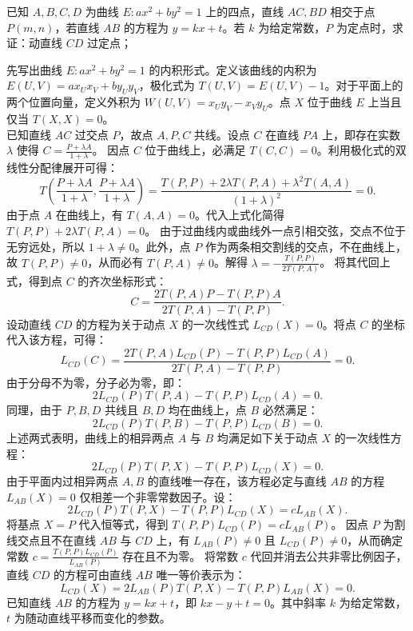 \begin{example}
已知 \(A,B,C,D\) 为曲线 \(E: ax^2 + by^2 = 1\) 上的四点，直线 \(AC,BD\) 相交于点 \(P(m,n)\)，若直线 \(AB\) 的方程为 \(y = kx + t\)。若 \(k\) 为给定常数，\(P\) 为定点时，求证：动直线 \(CD\) 过定点；
\end{example}
\begin{solution}
先写出曲线 $E: ax^2 + by^2 = 1$ 的内积形式。定义该曲线的内积为 $E(U, V) = ax_U x_V + by_U y_V$，极化式为 $T(U, V) = E(U, V) - 1$。对于平面上的两个位置向量，定义外积为 $W(U, V) = x_U y_V - x_V y_U$。点 $X$ 位于曲线 $E$ 上当且仅当 $T(X, X) = 0$。\\
已知直线 $AC$ 过交点 $P$，故点 $A, P, C$ 共线。设点 $C$ 在直线 $PA$ 上，即存在实数 $\lambda$ 使得 $C = \frac{P + \lambda A}{1+\lambda}$。
因点 $C$ 位于曲线上，必满足 $T(C, C) = 0$。利用极化式的双线性分配律展开可得：
\[ T\left(\frac{P + \lambda A}{1+\lambda}, \frac{P + \lambda A}{1+\lambda}\right) = \frac{T(P, P) + 2\lambda T(P, A) + \lambda^2 T(A, A)}{(1+\lambda)^2} = 0. \]
由于点 $A$ 在曲线上，有 $T(A, A) = 0$。代入上式化简得 $T(P, P) + 2\lambda T(P, A) = 0$。
由于过曲线内或曲线外一点引相交弦，交点不位于无穷远处，所以 $1+\lambda \neq 0$。此外，点 $P$ 作为两条相交割线的交点，不在曲线上，故 $T(P, P) \neq 0$，从而必有 $T(P, A) \neq 0$。解得 $\lambda = -\frac{T(P, P)}{2T(P, A)}$。
将其代回上式，得到点 $C$ 的齐次坐标形式：
\[ C = \frac{2T(P, A)P - T(P, P)A}{2T(P, A) - T(P, P)}. \]
设动直线 $CD$ 的方程为关于动点 $X$ 的一次线性式 $L_{CD}(X) = 0$。将点 $C$ 的坐标代入该方程，可得：
\[ L_{CD}(C) = \frac{2T(P, A)L_{CD}(P) - T(P, P)L_{CD}(A)}{2T(P, A) - T(P, P)} = 0. \]
由于分母不为零，分子必为零，即：
\[ 2L_{CD}(P)T(P, A) - T(P, P)L_{CD}(A) = 0. \]
同理，由于 $P, B, D$ 共线且 $B, D$ 均在曲线上，点 $B$ 必然满足：
\[ 2L_{CD}(P)T(P, B) - T(P, P)L_{CD}(B) = 0. \]
上述两式表明，曲线上的相异两点 $A$ 与 $B$ 均满足如下关于动点 $X$ 的一次线性方程：
\[ 2L_{CD}(P)T(P, X) - T(P, P)L_{CD}(X) = 0. \]
由于平面内过相异两点 $A, B$ 的直线唯一存在，该方程必定与直线 $AB$ 的方程 $L_{AB}(X) = 0$ 仅相差一个非零常数因子。设：
\[ 2L_{CD}(P)T(P, X) - T(P, P)L_{CD}(X) = c L_{AB}(X). \]
将基点 $X = P$ 代入恒等式，得到 $T(P, P)L_{CD}(P) = c L_{AB}(P)$。
因点 $P$ 为割线交点且不在直线 $AB$ 与 $CD$ 上，有 $L_{AB}(P) \neq 0$ 且 $L_{CD}(P) \neq 0$，从而确定常数 $c = \frac{T(P, P)L_{CD}(P)}{L_{AB}(P)}$ 存在且不为零。
将常数 $c$ 代回并消去公共非零比例因子，直线 $CD$ 的方程可由直线 $AB$ 唯一等价表示为：
\[ L_{CD}(X) = 2L_{AB}(P)T(P, X) - T(P, P)L_{AB}(X) = 0. \]
已知直线 $AB$ 的方程为 $y = kx + t$，即 $kx - y + t = 0$。其中斜率 $k$ 为给定常数，$t$ 为随动直线平移而变化的参数。

\end{solution}
